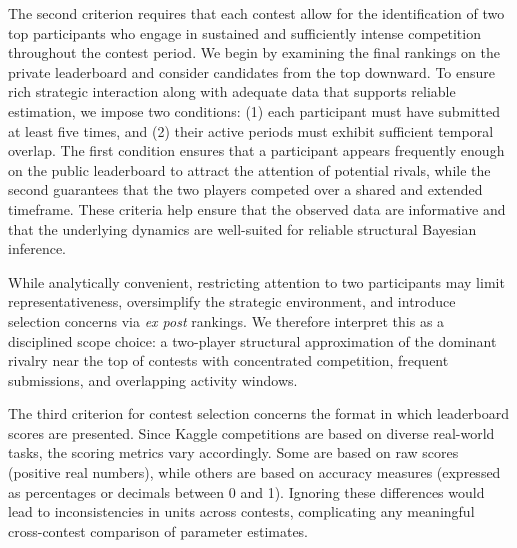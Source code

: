 \documentclass[mnsc]{informs3}
\begin{document}
The second criterion requires that each contest allow for the identification of two top participants who engage in sustained and sufficiently intense competition throughout the contest period.
We begin by examining the final rankings on the private leaderboard and consider candidates from the top downward.
To ensure rich strategic interaction along with adequate data that supports reliable estimation, we impose two conditions: (1) each participant must have submitted at least five times, and (2) their active periods must exhibit sufficient temporal overlap.
The first condition ensures that a participant appears frequently enough on the public leaderboard to attract the attention of potential rivals, while the second guarantees that the two players competed over a shared and extended timeframe.
These criteria help ensure that the observed data are informative and that the underlying dynamics are well-suited for reliable structural Bayesian inference.

While analytically convenient, restricting attention to two participants may limit representativeness, oversimplify the strategic environment, and introduce selection concerns via \textit{ex post} rankings.
We therefore interpret this as a disciplined scope choice: a two-player structural approximation of the dominant rivalry near the top of contests with concentrated competition, frequent submissions, and overlapping activity windows.

The third criterion for contest selection concerns the format in which leaderboard scores are presented.
Since Kaggle competitions are based on diverse real-world tasks, the scoring metrics vary accordingly.
Some are based on raw scores (positive real numbers), while others are based on accuracy measures (expressed as percentages or decimals between 0 and 1).
Ignoring these differences would lead to inconsistencies in units across contests, complicating any meaningful cross-contest comparison of parameter estimates.
\end{document}
